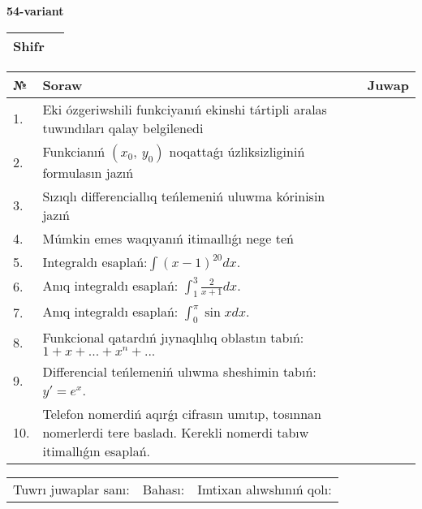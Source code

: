 \documentclass{article}
\begin{document}
  \egroup
  
  \newpage
  
  
  \textbf{54-variant}\\
  
  \bgroup
  \def\arraystretch{1.6} %
  
  \begin{tabular}{|m{5.7cm}|m{9.5cm}|}
  \hline
  Shifr & \\
  \hline
  \end{tabular}
  
  \vspace{1cm}
  
  \begin{tabular}{|m{0.7cm}|m{10cm}|m{4cm}|}
  \hline
  № & Soraw & Juwap \\
  \hline
  1. & Eki ózgeriwshili funkciyanıń ekinshi tártipli aralas tuwındıları qalay belgilenedi &  \\
  \hline
  2. & Funkcianıń \((x_{0},\ y_{0})\) noqattaǵı úzliksizliginiń formulasın jazıń &  \\
  \hline
  3. & Sızıqlı differenciallıq teńlemeniń uluwma kórinisin jazıń &  \\
  \hline
  4. & Múmkin emes waqıyanıń itimaıllıǵı nege teń &  \\
  \hline
  5. & Integraldı esaplań:\(\int{(x - 1)^{20}}dx\). &  \\
  \hline
  6. & Anıq integraldı esaplań: \(\int_{1}^{3}\frac{2}{x + 1}dx\). &  \\
  \hline
  7. & Anıq integraldı esaplań: \(\int_{0}^{\pi}{\sin xdx}\). &  \\
  \hline
  8. & Funkcional qatardıń jıynaqlılıq oblastın tabıń:\(1 + x + ... + x^{n} + ...\) &  \\
  \hline
  9. & Differencial teńlemeniń ulıwma sheshimin tabıń: \(y' = e^{x}\). &  \\
  \hline
  10. & Telefon nomerdiń aqırǵı cifrasın umıtıp, tosınnan nomerlerdi tere basladı. Kerekli nomerdi tabıw itimallıǵın esaplań. &  \\
  \hline
  \end{tabular}
  
  \vspace{1cm}
  
  \begin{tabular}{lll}
  Tuwrı juwaplar sanı: \underline{\hspace{1.5cm}} & 
  Bahası: \underline{\hspace{1.5cm}} & 
  Imtixan alıwshınıń qolı: \underline{\hspace{2cm}} \\
  \end{tabular}
  
\end{document}
